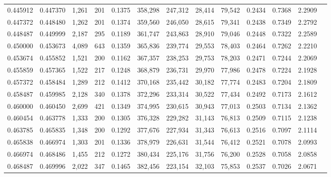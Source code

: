 \begin{tabular}{rrrrrrrrrrrrr}
0.445912 & 0.447370 & 1,261 & 201 &                                     0.1375 & 358,298 & 247,312 &  28,414 &  79,542 & 0.2434 & 0.7368 & 2.2909 \\
0.447372 & 0.448480 & 1,262 & 201 &                                     0.1374 & 359,560 & 246,050 &  28,615 &  79,341 & 0.2438 & 0.7349 & 2.2792 \\
0.448487 & 0.449999 & 2,187 & 295 &                                     0.1189 & 361,747 & 243,863 &  28,910 &  79,046 & 0.2448 & 0.7322 & 2.2589 \\
0.450000 & 0.453673 & 4,089 & 643 &                                     0.1359 & 365,836 & 239,774 &  29,553 &  78,403 & 0.2464 & 0.7262 & 2.2210 \\
0.453674 & 0.455852 & 1,521 & 200 &                                     0.1162 & 367,357 & 238,253 &  29,753 &  78,203 & 0.2471 & 0.7244 & 2.2069 \\
0.455859 & 0.457365 & 1,522 & 217 &                                     0.1248 & 368,879 & 236,731 &  29,970 &  77,986 & 0.2478 & 0.7224 & 2.1928 \\
0.457372 & 0.458484 & 1,289 & 212 &                                     0.1412 & 370,168 & 235,442 &  30,182 &  77,774 & 0.2483 & 0.7204 & 2.1809 \\
0.458487 & 0.459985 & 2,128 & 340 &                                     0.1378 & 372,296 & 233,314 &  30,522 &  77,434 & 0.2492 & 0.7173 & 2.1612 \\
0.460000 & 0.460450 & 2,699 & 421 &                                     0.1349 & 374,995 & 230,615 &  30,943 &  77,013 & 0.2503 & 0.7134 & 2.1362 \\
0.460454 & 0.463778 & 1,333 & 200 &                                     0.1305 & 376,328 & 229,282 &  31,143 &  76,813 & 0.2509 & 0.7115 & 2.1238 \\
0.463785 & 0.465835 & 1,348 & 200 &                                     0.1292 & 377,676 & 227,934 &  31,343 &  76,613 & 0.2516 & 0.7097 & 2.1114 \\
0.465838 & 0.466974 & 1,303 & 201 &                                     0.1336 & 378,979 & 226,631 &  31,544 &  76,412 & 0.2521 & 0.7078 & 2.0993 \\
0.466974 & 0.468486 & 1,455 & 212 &                                     0.1272 & 380,434 & 225,176 &  31,756 &  76,200 & 0.2528 & 0.7058 & 2.0858 \\
0.468487 & 0.469996 & 2,022 & 347 &                                     0.1465 & 382,456 & 223,154 &  32,103 &  75,853 & 0.2537 & 0.7026 & 2.0671 \\

\end{tabular}
